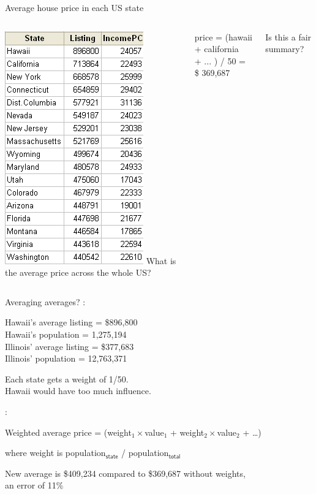 \documentclass[aspectratio=169,usenames,dvipsnames]{beamer}
\begin{document}
\begin{frame}{Average house price in each US state}
\begin{columns}
\includegraphics[height=0.8\textheight]{fig/housepricesincome}
What is the average price across the whole US?

\pause\vspace{1em}
price = (hawaii + california \\
    + ... ) / 50 = \$ 369,687

\vspace{1em}
Is this a fair summary?
\end{columns}
\end{frame}

\begin{frame}{Averaging averages?}
:

Hawaii's average listing = \$896,800\\
Hawaii's population = 1,275,194\\
Illinois' average listing = \$377,683\\
Illinois' population = 12,763,371

\vspace{1em}
Each state gets a weight of 1/50.\\
Hawaii would have too much influence.

\pause
{}:
\begin{block}{Weighted average}
price = (weight$_1 \times $value$_1$ + weight$_2 \times $value$_2$ + \dots)

    where weight is population$_{\textsf{state}}$ / population$_{\textsf{total}}$
\end{block}

\vspace{1em}
New average is \$409,234 compared to \$369,687 without weights, \\
an error of 11\%
\end{frame}
\end{document}
